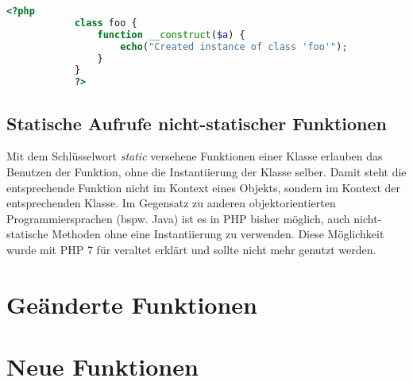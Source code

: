         \begin{lstlisting}[language=php, caption={Beispiel eines expliziten Konstruktors}, label={lst:php5construct}]
            <?php
            class foo {
                function __construct($a) {
                    echo("Created instance of class 'foo'");
                }
            }
            ?>
        \end{lstlisting}
    
    \subsection{Statische Aufrufe nicht-statischer Funktionen}
    Mit dem Schlüsselwort \textit{static} versehene Funktionen einer Klasse erlauben das Benutzen der Funktion, ohne die 
    Instantiierung der Klasse selber. Damit steht die entsprechende Funktion nicht im Kontext eines Objekts, sondern 
    im Kontext der entsprechenden Klasse. Im Gegensatz zu anderen objektorientierten Programmiersprachen (bspw. Java) ist es 
    in PHP bisher möglich, auch nicht-statische Methoden ohne eine Instantiierung zu verwenden. Diese Möglichkeit wurde mit
    PHP 7 für veraltet erklärt und sollte nicht mehr genutzt werden.

\section{Geänderte Funktionen}

\section{Neue Funktionen}
